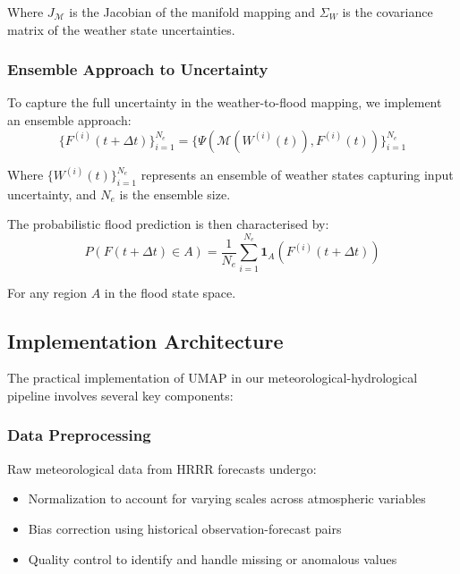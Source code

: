 \documentclass{article}
\begin{document}
Where $J_{\mathcal{M}}$ is the Jacobian of the manifold mapping and $\Sigma_W$ is the covariance matrix of the weather state uncertainties.

\subsubsection{Ensemble Approach to Uncertainty}
To capture the full uncertainty in the weather-to-flood mapping, we implement an ensemble approach:
\begin{equation}
\{F^{(i)}(t+\Delta t)\}_{i=1}^{N_e} = \{\Psi(\mathcal{M}(W^{(i)}(t)), F^{(i)}(t))\}_{i=1}^{N_e}
\end{equation}

Where $\{W^{(i)}(t)\}_{i=1}^{N_e}$ represents an ensemble of weather states capturing input uncertainty, and $N_e$ is the ensemble size.

The probabilistic flood prediction is then characterised by:
\begin{equation}
P(F(t+\Delta t) \in A) = \frac{1}{N_e}\sum_{i=1}^{N_e} \mathbf{1}_{A}(F^{(i)}(t+\Delta t))
\end{equation}

For any region $A$ in the flood state space.

\subsection{Implementation Architecture}
The practical implementation of UMAP in our meteorological-hydrological pipeline involves several key components:

\subsubsection{Data Preprocessing}
Raw meteorological data from HRRR forecasts undergo:
\begin{itemize}
\item Normalization to account for varying scales across atmospheric variables
\item Bias correction using historical observation-forecast pairs
\item Quality control to identify and handle missing or anomalous values
\end{itemize}
\end{document}
